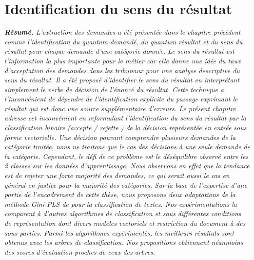 \chapter{Identification du sens du résultat}
\label{chap:sensresultat}


%
%
%
%
%
%
%

\textit{\small \textbf{Résumé.} L'extraction des demandes a été présentée dans le chapitre précédent comme l'identification du quantum demandé, du quantum résultat et du sens du résultat pour chaque demande d'une catégorie donnée. Le sens du résultat est l'information la plus importante pour le métier car elle donne une idée du taux d'acceptation des demandes dans les tribunaux pour une analyse descriptive du sens du résultat. Il a été proposé d'identifier le sens du résultat en interprétant simplement le verbe de décision de l'énoncé du résultat. Cette technique a l'inconvénient de dépendre de l'identification explicite du passage exprimant le résultat qui est donc une source supplémentaire d'erreurs. Le présent chapitre adresse cet inconvénient en reformulant l'identification du sens du résultat par la classification binaire (\og accepte \fg{} / \og rejette \fg{}) de la décision représentée en entrée sous forme vectorielle. Une décision pouvant comprendre plusieurs demandes de la catégorie traitée, nous ne traitons que le cas des décisions à une seule demande de la catégorie. Cependant, le défi de ce problème est le déséquilibre observé entre les 2 classes sur les données d'apprentissage. Nous observons en effet que la tendance est de rejeter une forte majorité des demandes, ce qui serait aussi le cas en général en justice pour la majorité des catégories. Sur la base de l'expertise d'une partie de l'encadrement de cette thèse, nous proposons deux adaptations de la méthode Gini-PLS de \citet{mussard2018ginipls} pour la classification de textes. Nos expérimentations la comparent à d'autres algorithmes de classification et sous différentes conditions de représentation dont divers modèles vectoriels et restriction du document à des sous-parties. Parmi les algorithmes expérimentés, les meilleurs résultats sont obtenus avec les arbres de classification. Nos propositions obtiennent néanmoins des scores d'évaluation proches de ceux des arbres.}


